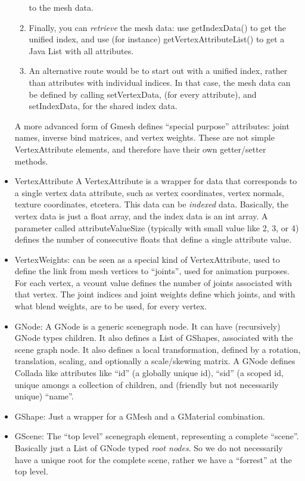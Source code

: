\begin{itemize}
\begin{enumerate}
to the mesh data. 
\item Finally, you can \emph{retrieve} the mesh data: use getIndexData() to get the unified index,
and use (for instance) getVertexAttributeList() to get a Java List with all attributes.
\item An alternative route would be to start out with a unified index, rather than attributes with individual indices.    In that case, the mesh data can be defined by calling setVertexData, (for every attribute), 
    and setIndexData, for the shared index data. 
\end{enumerate}
A more advanced form of Gmesh defines ``special purpose'' attributes: joint names, inverse bind matrices,
and vertex weights. These are not simple VertexAttribute elements, and therefore have
their own getter/setter methods.
\item VertexAttribute
A VertexAttribute is a wrapper for data that corresponds to a single vertex data attribute, such as
vertex coordinates, vertex normals, texture coordinates, etcetera. This data can be \emph{indexed} data.
Basically, the vertex data is just a float array, and the index data is an int array.
A parameter called attributeValueSize (typically with small value like 2, 3, or 4) defines
the number of consecutive floats that define a single attribute value.

\item VertexWeights: can be seen as a special kind of VertexAttribute, used to define 
the link from mesh vertices to ``joints'', used for animation purposes.
For each vertex, a vcount value defines the number of joints associated with that vertex.
The joint indices and joint weights define which joints, and with what blend weights, are to be used,
for every vertex. 

\item GNode: A GNode is a generic scenegraph node. It can have (recursively) GNode types children.
It also defines a List of GShapes, associated with the scene graph node. 
It also defines a local transformation, defined by a rotation, translation, scaling, and
optionally a scale/skewing matrix. 
A GNode defines Collada like attributes like ``id'' (a globally unique id), ``sid'' (a scoped id, unique amongs a collection of children, and (friendly but not necessarily unique) ``name''.

\item GShape: Just a wrapper for a GMesh and a GMaterial combination.
\item GScene: The ``top level'' scenegraph element, representing a complete ``scene''.
Basically just a List of GNode typed \emph{root nodes}. So we do not necessarily have a unique root
for the complete scene, rather we have a ``forrest'' at the top level.


\end{itemize}